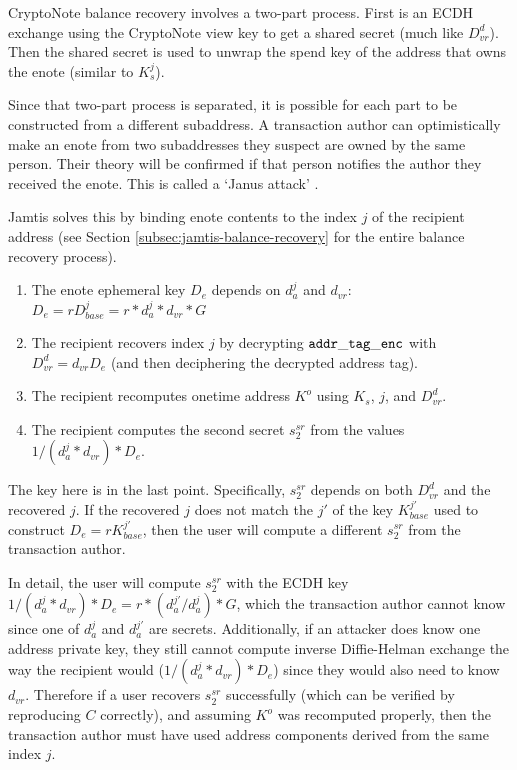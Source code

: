 CryptoNote balance recovery involves a two-part process. First is an ECDH exchange using the CryptoNote view key to get a shared secret (much like $D^d_{vr}$). Then the shared secret is used to unwrap the spend key of the address that owns the enote (similar to $K^j_s$).

Since that two-part process is separated, it is possible for each part to be constructed from a different subaddress. A transaction author can optimistically make an enote from two subaddresses they suspect are owned by the same person. Their theory will be confirmed if that person notifies the author they received the enote. This is called a `Janus attack' \cite{janus-attack}.

Jamtis solves this by binding enote contents to the index $j$ of the recipient address (see Section \ref{subsec:jamtis-balance-recovery} for the entire balance recovery process).
\begin{enumerate}
    \item The enote ephemeral key $D_e$ depends on $d^j_a$ and $d_{vr}$: $D_e = r D^j_{base} = r * d^j_a * d_{vr} * G$

    \item The recipient recovers index $j$ by decrypting ${\tt addr\_tag\_enc}$ with $D^d_{vr} = d_{vr} D_e$ (and then deciphering the decrypted address tag).

    \item The recipient recomputes onetime address $K^o$ using $K_s$, $j$, and $D^d_{vr}$.

    \item The recipient computes the second secret $s^{sr}_2$ from the values $1/(d^j_a * d_{vr}) * D_e$.
\end{enumerate}

The key here is in the last point. Specifically, $s^{sr}_2$ depends on both $D^d_{vr}$ and the recovered $j$. If the recovered $j$ does not match the $j'$ of the key $K^{j'}_{base}$ used to construct $D_e = r K^{j'}_{base}$, then the user will compute a different $s^{sr}_2$ from the transaction author.

In detail, the user will compute $s^{sr}_2$ with the ECDH key $1/(d^j_a * d_{vr}) * D_e = r * (d^{j'}_a/d^{j}_a) * G$, which the transaction author cannot know since one of $d^{j}_a$ and $d^{j'}_a$ are secrets. Additionally, if an attacker does know one address private key, they still cannot compute inverse Diffie-Helman exchange the way the recipient would ($1/(d^j_a * d_{vr}) * D_e$) since they would also need to know $d_{vr}$. Therefore if a user recovers $s^{sr}_2$ successfully (which can be verified by reproducing $C$ correctly), and assuming $K^o$ was recomputed properly, then the transaction author must have used address components derived from the same index $j$.

